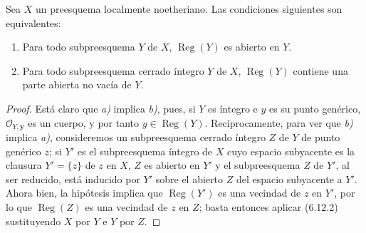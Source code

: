 \begin{corollary}[6.12.3]
\label{IV.2.s6.12.3-fr}
Sea $X$ un preesquema localmente noetheriano. Las condiciones siguientes son
equivalentes:
\begin{enumerate}
\item[\textup{a)}] Para todo subpreesquema $Y$ de $X$,
$\operatorname{Reg}(Y)$ es abierto en $Y$.


\item[\textup{b)}] Para todo subpreesquema cerrado íntegro $Y$ de $X$,
$\operatorname{Reg}(Y)$ contiene una parte abierta no vacía de $Y$.
\end{enumerate}
\end{corollary}

\begin{proof}
Está claro que \emph{a)} implica \emph{b)}, pues, si $Y$ es íntegro e $y$ es su punto
genérico, $\mathcal O_{Y,\boldsymbol{y}}$ es un cuerpo, y por tanto
$y\in\operatorname{Reg}(Y)$. Recíprocamente, para ver que \emph{b)} implica \emph{a)},
consideremos un subpreesquema cerrado íntegro $Z$ de $Y$ de punto genérico
$z$; si $Y'$ es el subpreesquema íntegro de $X$ cuyo espacio subyacente es la
clausura $Y'=\overline{\{z\}}$ de $z$ en $X$, $Z$ es abierto en $Y'$ y el
subpreesquema $Z$ de $Y'$, al ser reducido, está inducido por $Y'$ sobre el
abierto $Z$ del espacio subyacente a $Y'$. Ahora bien, la hipótesis implica
que $\operatorname{Reg}(Y')$ es una vecindad de $z$ en $Y'$, por lo que
$\operatorname{Reg}(Z)$ es una vecindad de $z$ en $Z$; basta entonces aplicar
(6.12.2) sustituyendo $X$ por $Y$ e $Y$ por $Z$.
\end{proof}
